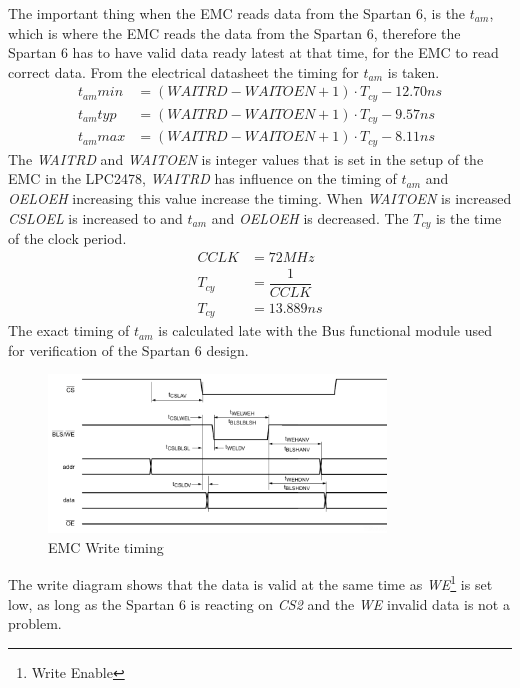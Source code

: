 The important thing when the EMC reads data from the Spartan 6, is the $t_{am}$, which is where the EMC reads the data from the Spartan 6, therefore the Spartan 6 has to have valid data ready latest at that time, for the EMC to read correct data. From the electrical datasheet the timing for $t_{am}$ is taken.
\begin{align}
t_{am}min &= (WAITRD - WAITOEN + 1) \cdot T_{cy} - 12.70ns\\
t_{am}typ &= (WAITRD - WAITOEN + 1) \cdot T_{cy} - 9.57ns\\
t_{am}max &= (WAITRD - WAITOEN + 1) \cdot T_{cy} - 8.11ns
\end{align}
The \textit{WAITRD} and \textit{WAITOEN} is integer values that is set in the setup of the EMC in the LPC2478, \textit{WAITRD} has influence on the timing of $t_{am}$ and \textit{OELOEH} increasing this value increase the timing. When \textit{WAITOEN} is increased \textit{CSLOEL} is increased to and $t_{am}$ and \textit{OELOEH} is decreased. The $T_{cy}$ is the time of the clock period.
\begin{align}
CCLK &= 72MHz\\
T_{cy} &= \dfrac{1}{CCLK}\\
T_{cy} &= 13.889ns
\end{align}
The exact timing of $t_{am}$ is calculated late with the Bus functional module used for verification of the Spartan 6 design.
\begin{figure}[H]
	\begin{centering}
		\includegraphics[width=0.8\textwidth]{images/tb7_EMC_write.png}
		\caption{EMC Write timing}
	\end{centering}
\end{figure}
The write diagram shows that the data is valid at the same time as \textit{WE}\footnote{Write Enable} is set low, as long as the Spartan 6 is reacting on \textit{CS2} and the \textit{WE} invalid data is not a problem.
